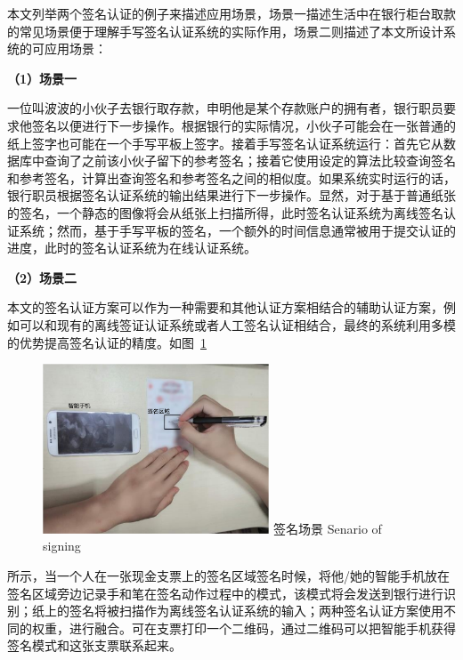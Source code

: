 本文列举两个签名认证的例子来描述应用场景，场景一描述生活中在银行柜台取款的常见场景便于理解手写签名认证系统的实际作用，场景二则描述了本文所设计系统的可应用场景：

\textbf{（1）场景一}

一位叫波波的小伙子去银行取存款，申明他是某个存款账户的拥有者，银行职员要求他签名以便进行下一步操作。根据银行的实际情况，小伙子可能会在一张普通的纸上签字也可能在一个手写平板上签字。接着手写签名认证系统运行：首先它从数据库中查询了之前该小伙子留下的参考签名；接着它使用设定的算法比较查询签名和参考签名，计算出查询签名和参考签名之间的相似度。如果系统实时运行的话，银行职员根据签名认证系统的输出结果进行下一步操作。显然，对于基于普通纸张的签名，一个静态的图像将会从纸张上扫描所得，此时签名认证系统为离线签名认证系统；然而，基于手写平板的签名，一个额外的时间信息通常被用于提交认证的进度，此时的签名认证系统为在线认证系统。

\textbf{（2）场景二}

本文的签名认证方案可以作为一种需要和其他认证方案相结合的辅助认证方案，例如可以和现有的离线签证认证系统或者人工签名认证相结合，最终的系统利用多模的优势提高签名认证的精度。如图~\ref{fig:sign-senario}
\begin{figure}[!htp]
  \centering
  \includegraphics[width=0.6\textwidth]{figure/acoustic-senario.pdf}
  \bicaption
    {签名场景}
    {Senario of signing}
  \label{fig:sign-senario}
\end{figure}
所示，当一个人在一张现金支票上的签名区域签名时候，将他/她的智能手机放在签名区域旁边记录手和笔在签名动作过程中的模式，该模式将会发送到银行进行识别；纸上的签名将被扫描作为离线签名认证系统的输入；两种签名认证方案使用不同的权重，进行融合。可在支票打印一个二维码，通过二维码可以把智能手机获得签名模式和这张支票联系起来。


